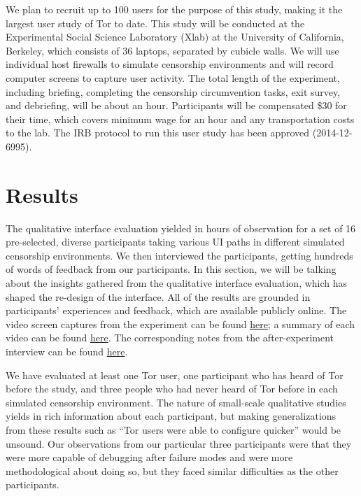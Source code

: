 \documentclass{template}
\begin{document}
We plan to recruit up to 100 users for the purpose of this study,
making it the largest user study of Tor to date.  This study will be conducted at the
Experimental Social Science Laboratory (Xlab)
at the University of California, Berkeley, which consists of 36 laptops,
separated by cubicle walls. We will use individual host firewalls to simulate
censorship environments and will record computer screens to capture 
user activity. The total length of the experiment, including briefing, completing the censorship 
circumvention tasks, exit survey, and debriefing, will be about an hour.
Participants will be compensated \$30 for their time, which covers
minimum wage for an hour and any transportation costs to the lab. 
The IRB protocol to run this user study has been approved (2014-12-6995). 


\section{Results}

The qualitative interface evaluation yielded in hours of observation for a set of 16 pre-selected, diverse participants taking various UI paths in different simulated censorship environments. We then interviewed the participants, getting hundreds of words of feedback from our participants. In this section, we will be talking about the insights gathered from the qualitative interface evaluation, which has shaped the re-design of the interface. All of the results are grounded in participants' experiences and feedback, which are available publicly online. The video screen captures from the experiment can be found \href{https://github.com/lindanlee/circumvention-ux-tor/tree/master/sessions/pre/videos}{here}; a summary of each video can be found \href{https://github.com/lindanlee/circumvention-ux-tor/blob/master/sessions/pre/participant-summaries.txt}{here}. The corresponding notes from the after-experiment interview can be found \href{https://github.com/lindanlee/circumvention-ux-tor/tree/master/sessions/pre/notes}{here}. 

We have evaluated at least one Tor user, one participant who has heard of Tor before the study, and three people who had never heard of Tor before in each simulated censorship environment. The nature of small-scale qualitative studies yields in rich information about each participant, but making generalizations from these results such as ``Tor users were able to configure quicker'' would be unsound. Our observations from our particular three participants were that they were more capable of debugging after failure modes and were more methodological about doing so, but they faced similar difficulties as the other participants. 
\end{document}
